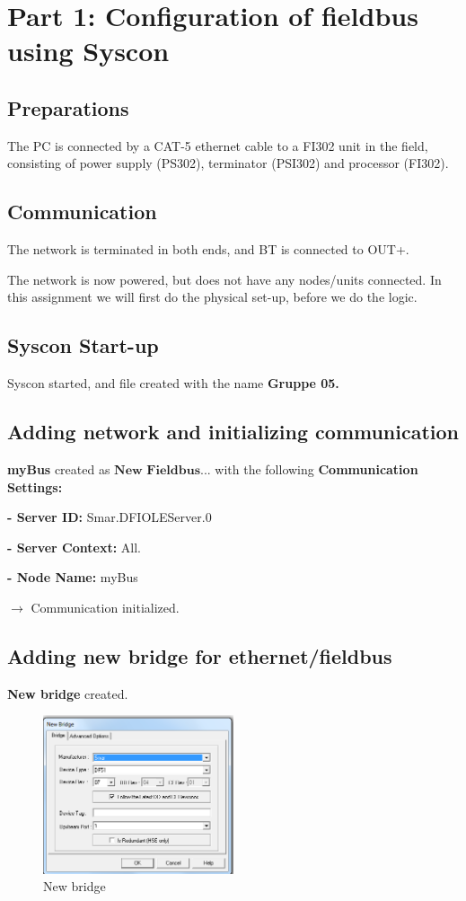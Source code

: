 \section{Part 1: Configuration of fieldbus using Syscon}
\subsection{Preparations}
The PC is connected by a CAT-5 ethernet cable to a FI302 unit in the field, consisting of power supply (PS302), terminator (PSI302) and processor (FI302).

\subsection{Communication}
The network is terminated in both ends, and BT is connected to OUT+. 

The network is now powered, but does not have any nodes/units connected. In this assignment we will first do the physical set-up, before we do the logic.


\subsection{Syscon Start-up}
Syscon started, and file created with the name \textbf{Gruppe 05.}

\subsection{Adding network and initializing communication}

\textbf{myBus} created as $\textbf{New Fieldbus...}$ with the following \textbf{Communication Settings:}

\textbf{- Server ID:} Smar.DFIOLEServer.0

\textbf{- Server Context:} All.

\textbf{- Node Name:} myBus

$\rightarrow$ Communication initialized.

\newpage
\subsection{Adding new bridge for ethernet/fieldbus}
\textbf{New bridge} created.

\begin{figure}[!htb]
    \centering
    \centerline{\includegraphics[width=0.5\textwidth]{images/newBridge}}
    \caption{New bridge}
    \end{figure}



